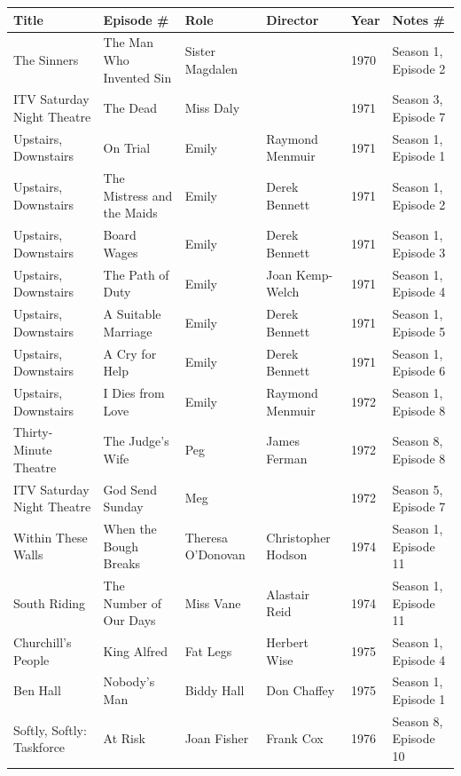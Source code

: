 \documentclass{article}
\begin{document}
\begin{tabular}{llllll}
\toprule
Title & Episode \# & Role & Director & Year & Notes \# \\
\midrule
The Sinners & The Man Who Invented Sin & Sister Magdalen &  & 1970 & Season 1, Episode 2 \\
ITV Saturday Night Theatre & The Dead & Miss Daly &  & 1971 & Season 3, Episode 7 \\
Upstairs, Downstairs & On Trial & Emily & Raymond Menmuir & 1971 & Season 1, Episode 1 \\
Upstairs, Downstairs & The Mistress and the Maids & Emily & Derek Bennett & 1971 & Season 1, Episode 2 \\
Upstairs, Downstairs & Board Wages & Emily & Derek Bennett & 1971 & Season 1, Episode 3 \\
Upstairs, Downstairs & The Path of Duty & Emily & Joan Kemp-Welch & 1971 & Season 1, Episode 4 \\
Upstairs, Downstairs & A Suitable Marriage & Emily & Derek Bennett & 1971 & Season 1, Episode 5 \\
Upstairs, Downstairs & A Cry for Help & Emily & Derek Bennett & 1971 & Season 1, Episode 6 \\
Upstairs, Downstairs & I Dies from Love & Emily & Raymond Menmuir & 1972 & Season 1, Episode 8 \\
Thirty-Minute Theatre & The Judge's Wife & Peg & James Ferman & 1972 & Season 8, Episode 8 \\
ITV Saturday Night Theatre & God Send Sunday & Meg &  & 1972 & Season 5, Episode 7 \\
Within These Walls & When the Bough Breaks & Theresa O'Donovan & Christopher Hodson & 1974 & Season 1, Episode 11 \\
South Riding & The Number of Our Days & Miss Vane & Alastair Reid & 1974 & Season 1, Episode 11 \\
Churchill's People & King Alfred & Fat Legs & Herbert Wise & 1975 & Season 1, Episode 4 \\
Ben Hall & Nobody's Man & Biddy Hall & Don Chaffey & 1975 & Season 1, Episode 1 \\
Softly, Softly: Taskforce & At Risk & Joan Fisher & Frank Cox & 1976 & Season 8, Episode 10 \\
\bottomrule
\end{tabular}
\end{document}

